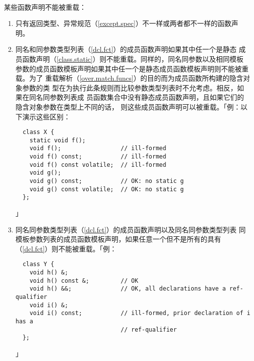 \paragraph{}
某些函数声明不能被重载：
\begin{enumerate}
  \item{只有返回类型、异常规范（\ref{except.spec}）不一样或两者都不一样的函数声
    明。}
  \item{同名和同参数类型列表（\ref{dcl.fct}）的成员函数声明如果其中任一个是静态
    成员函数声明（\ref{class.static}）则不能重载。同样的，同名同参数以及相同模板
    参数的成员函数模板声明如果其中任一个是静态成员函数模板声明则不能被重载。为了
    重载解析（\ref{over.match.funcs}）的目的而为成员函数所构建的隐含对象参数的类
    型在为执行此条规则而比较参数类型列表时不允考虑。相反，如果在同名同参数列表成
    员函数集合中没有静态成员函数声明，且如果它们的隐含对象参数在类型上不同的话，
    则这些成员函数声明可以被重载。「例：以下演示这些区别：
\begin{lstlisting}
  class X {
    static void f();
    void f();                 // ill-formed
    void f() const;           // ill-formed
    void f() const volatile;  // ill-formed
    void g();
    void g() const;           // OK: no static g
    void g() const volatile;  // OK: no static g
  };
\end{lstlisting}」}
  \item{同名同参数类型列表（\ref{dcl.fct}）的成员函数声明以及同名同参数类型列表
    同模板参数列表的成员函数模板声明，如果任意一个但不是所有的具有
    （\ref{dcl.fct}）则不能被重载。「例：
\begin{lstlisting}
  class Y {
    void h() &;
    void h() const &;         // OK
    void h() &&;              // OK, all declarations have a ref-qualifier
    void i() &;
    void i() const;           // ill-formed, prior declaration of i has a
                              // ref-qualifier
  };
\end{lstlisting}」}
\end{enumerate}

